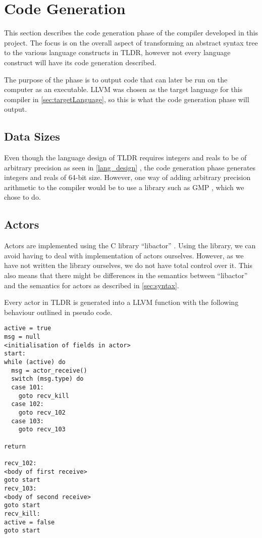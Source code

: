 \section{Code Generation}

This section describes the code generation phase of the compiler developed in this project. The focus is on the overall aspect of transforming an abstract syntax tree to the various language constructs in TLDR, however not every language construct will have its code generation described. 

The purpose of the phase is to output code that can later be run on the computer as an executable. LLVM was chosen as the target language for this compiler in \cref{sec:targetLanguage}, so this is what the code generation phase will output. 

\subsection{Data Sizes}

Even though the language design of TLDR requires integers and reals to be of arbitrary precision as seen in \cref{lang_design} , the code generation phase generates integers and reals of 64-bit size. However, one way of adding arbitrary precision arithmetic to the compiler would be to use a library such as GMP \cite{gmp}, which we chose to do.

\subsection{Actors}

Actors are implemented using the C library \enquote{libactor} \cite{libactor}. Using the library, we can avoid having to deal with implementation of actors ourselves. However, as we have not written the library ourselves, we do not have total control over it. This also means that there might be differences in the semantics between \enquote{libactor} and the semantics for actors as described in \cref{sec:syntax}.

Every actor in TLDR is generated into a LLVM function with the following behaviour outlined in pseudo code.

\begin{verbatim}
active = true
msg = null
<initialisation of fields in actor>
start:
while (active) do
  msg = actor_receive()
  switch (msg.type) do
  case 101:
    goto recv_kill
  case 102:
    goto recv_102
  case 103:
    goto recv_103

return

recv_102:
<body of first receive>
goto start 
recv_103:
<body of second receive>
goto start 
recv_kill:
active = false
goto start
\end{verbatim}

